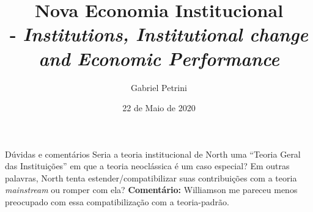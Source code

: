 \documentclass[11pt,lineno]{../style}
\title{
\large{Nova Economia Institucional}\vspace{2pt}\\
\Huge{\autor - \textit{Institutions, Institutional change and Economic Performance}}
}
\date{22 de Maio de 2020}
\author[$\ast$]{Gabriel Petrini}
\affil[$\ast$]{PhD Student at Unicamp.}
\begin{document}
\maketitle
\marginmark
\thispagestyle{firststyle}






	
\begin{redbox}{Dúvidas e comentários}	
	Seria a teoria institucional de North uma ``Teoria Geral das Instituições'' em que a teoria neoclássica é um caso especial? Em outras palavras, North tenta estender/compatibilizar suas contribuições com a teoria \textit{mainstream} ou romper com ela? \textbf{Comentário:} Williamson me pareceu menos preocupado com essa compatibilização com a teoria-padrão.
\end{redbox}
\end{document}
